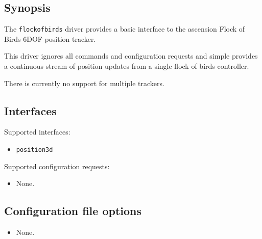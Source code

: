 \subsection*{Synopsis}
The {\tt flockofbirds} driver provides a basic interface to the ascension
Flock of Birds 6DOF position tracker.

This driver ignores all commands and configuration requests and simple provides a 
continuous stream of position updates from a single flock of birds controller.

There is currently no support for multiple trackers.

\subsection*{Interfaces}

\noindent Supported interfaces:

\begin{itemize}
\item {\tt position3d}
\end{itemize}

\noindent Supported configuration requests:
\begin{itemize}
\item None.
\end{itemize}


\subsection*{Configuration file options}
\begin{itemize}
\item None.
\end{itemize}
